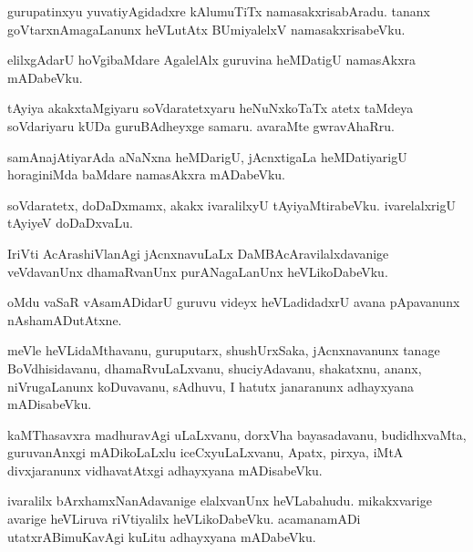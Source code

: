 \documentclass{article}
\begin{document}
\begin{mn}
gurupatinxyu yuvatiyAgidadxre kAlumuTiTx namasakxrisabAradu. tananx goVtarxnAmagaLanunx heVLutAtx 
BUmiyalelxV namasakxrisabeVku.
\end{mn}

\begin{mn}
elilxgAdarU hoVgibaMdare AgalelAlx guruvina heMDatigU namasAkxra mADabeVku.
\end{mn}

\begin{mn}
tAyiya akakxtaMgiyaru soVdaratetxyaru heNuNxkoTaTx atetx taMdeya soVdariyaru kUDa guruBAdheyxge 
samaru. avaraMte gwravAhaRru.
\end{mn}

\begin{mn}
samAnajAtiyarAda aNaNxna heMDarigU, jAcnxtigaLa heMDatiyarigU horaginiMda baMdare namasAkxra 
mADabeVku.
\end{mn}

\begin{mn}
soVdaratetx, doDaDxmamx, akakx ivaralilxyU tAyiyaMtirabeVku. ivarelalxrigU tAyiyeV doDaDxvaLu.
\end{mn}

\begin{mn}
IriVti AcArashiVlanAgi jAcnxnavuLaLx DaMBAcAravilalxdavanige veVdavanUnx dhamaRvanUnx 
purANagaLanUnx heVLikoDabeVku. 
\end{mn}

\begin{mn}
oMdu vaSaR vAsamADidarU guruvu videyx heVLadidadxrU avana pApavanunx nAshamADutAtxne.
\end{mn}

\begin{mn}
meVle heVLidaMthavanu, guruputarx, shushUrxSaka, jAcnxnavanunx tanage BoVdhisidavanu, 
dhamaRvuLaLxvanu, shuciyAdavanu, shakatxnu, ananx, niVrugaLanunx koDuvavanu, sAdhuvu, I hatutx 
janaranunx adhayxyana mADisabeVku.
\end{mn}

\begin{mn}
kaMThasavxra madhuravAgi uLaLxvanu, dorxVha bayasadavanu, budidhxvaMta, guruvanAnxgi 
mADikoLaLxlu iceCxyuLaLxvanu, Apatx, pirxya, iMtA divxjaranunx vidhavatAtxgi adhayxyana 
mADisabeVku.
\end{mn}

\begin{mn}
ivaralilx bArxhamxNanAdavanige elalxvanUnx heVLabahudu. mikakxvarige avarige heVLiruva riVtiyalilx 
heVLikoDabeVku. acamanamADi utatxrABimuKavAgi kuLitu adhayxyana mADabeVku.
\end{mn}
\end{document}
